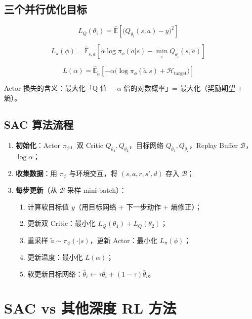 \documentclass{article}
\begin{document}
\subsection*{三个并行优化目标}

\[
\boxed{L_Q(\theta_i)  = \hat{\mathbb{E}}\!\left[\bigl(Q_{\theta_i}(s,a)-y\bigr)^2\right]}
\]

\[
\boxed{L_\pi(\phi)    = \hat{\mathbb{E}}_{s,\tilde a}\!\left[\alpha\log\pi_\phi(\tilde a|s) - \min_{i}Q_{\theta_i}(s,\tilde a)\right]}
\]

\[
\boxed{L(\alpha)      = \hat{\mathbb{E}}_{\tilde a}\!\left[-\alpha\bigl(\log\pi_\phi(\tilde a|s)+\mathcal{H}_\text{target}\bigr)\right]}
\]

Actor 损失的含义：最大化「Q 值 $-$ $\alpha$ 倍的对数概率」= 最大化（奖励期望 $+$ 熵）。

\subsection*{SAC 算法流程}

\begin{enumerate}
  \item \textbf{初始化}：Actor $\pi_\phi$，双 Critic $Q_{\theta_1}, Q_{\theta_2}$，目标网络 $Q_{\bar\theta_1}, Q_{\bar\theta_2}$，Replay Buffer $\mathcal{B}$，$\log\alpha$；
  \item \textbf{收集数据}：用 $\pi_\phi$ 与环境交互，将 $(s,a,r,s',d)$ 存入 $\mathcal{B}$；
  \item \textbf{每步更新}（从 $\mathcal{B}$ 采样 mini-batch）：
    \begin{enumerate}
      \item 计算软目标值 $y$（用目标网络 $+$ 下一步动作 $+$ 熵修正）；
      \item 更新双 Critic：最小化 $L_Q(\theta_1) + L_Q(\theta_2)$；
      \item 重采样 $\tilde a\sim\pi_\phi(\cdot|s)$，更新 Actor：最小化 $L_\pi(\phi)$；
      \item 更新温度：最小化 $L(\alpha)$；
      \item 软更新目标网络：$\bar\theta_i \leftarrow \tau\theta_i+(1-\tau)\bar\theta_i$。
    \end{enumerate}
\end{enumerate}


\section*{SAC vs 其他深度 RL 方法}
\end{document}
